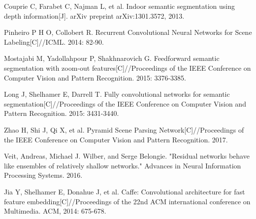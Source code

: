 \documentclass[10.5pt,compsoc]{TsT}
\theoremstyle{mystyle}
\begin{document}
\begin{thebibliography}{99}
Couprie C, Farabet C, Najman L, et al. Indoor semantic segmentation using depth information[J]. arXiv preprint arXiv:1301.3572, 2013.

Pinheiro P H O, Collobert R. Recurrent Convolutional Neural Networks for Scene Labeling[C]//ICML. 2014: 82-90.




Mostajabi M, Yadollahpour P, Shakhnarovich G. Feedforward semantic segmentation with zoom-out features[C]//Proceedings of the IEEE Conference on Computer Vision and Pattern Recognition. 2015: 3376-3385.


Long J, Shelhamer E, Darrell T. Fully convolutional networks for semantic segmentation[C]//Proceedings of the IEEE Conference on Computer Vision and Pattern Recognition. 2015: 3431-3440.


Zhao H, Shi J, Qi X, et al. Pyramid Scene Parsing Network[C]//Proceedings of the IEEE Conference on Computer Vision and Pattern Recognition. 2017.

Veit, Andreas, Michael J. Wilber, and Serge Belongie. "Residual networks behave like ensembles of relatively shallow networks." Advances in Neural Information Processing Systems. 2016.

Jia Y, Shelhamer E, Donahue J, et al. Caffe: Convolutional architecture for fast feature embedding[C]//Proceedings of the 22nd ACM international conference on Multimedia. ACM, 2014: 675-678.


\end{thebibliography}
\end{document}
